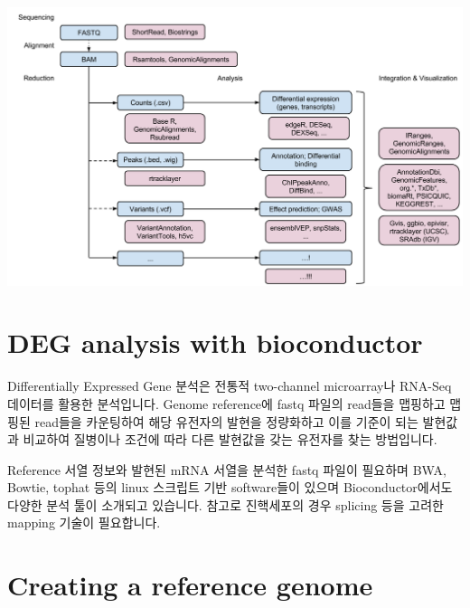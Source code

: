 \documentclass[
]{book}
\begin{document}
\includegraphics[width=6.25in,height=\textheight]{images/12/htanalysis.png}

\hypertarget{deg-analysis-with-bioconductor}{%
\section{DEG analysis with bioconductor}\label{deg-analysis-with-bioconductor}}

Differentially Expressed Gene 분석은 전통적 two-channel microarray나 RNA-Seq 데이터를 활용한 분석입니다. Genome reference에 fastq 파일의 read들을 맵핑하고 맵핑된 read들을 카운팅하여 해당 유전자의 발현을 정량화하고 이를 기준이 되는 발현값과 비교하여 질병이나 조건에 따라 다른 발현값을 갖는 유전자를 찾는 방법입니다.

Reference 서열 정보와 발현된 mRNA 서열을 분석한 fastq 파일이 필요하며 BWA, Bowtie, tophat 등의 linux 스크립트 기반 software들이 있으며 Bioconductor에서도 다양한 분석 툴이 소개되고 있습니다. 참고로 진핵세포의 경우 splicing 등을 고려한 mapping 기술이 필요합니다.

\hypertarget{creating-a-reference-genome}{%
\section{Creating a reference genome}\label{creating-a-reference-genome}}
\end{document}
